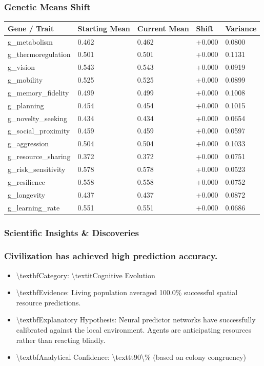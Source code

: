 \documentclass[11pt,a4paper]{article}
\begin{document}
\subsubsection*{ Genetic Means Shift}
\begin{longtable}{lllll}
\toprule
Gene / Trait & Starting Mean & Current Mean & Shift & Variance \\
\midrule
\endhead
g\_metabolism & 0.462 & 0.462 & +0.000 & 0.0800 \\
g\_thermoregulation & 0.501 & 0.501 & +0.000 & 0.1131 \\
g\_vision & 0.543 & 0.543 & +0.000 & 0.0919 \\
g\_mobility & 0.525 & 0.525 & +0.000 & 0.0899 \\
g\_memory\_fidelity & 0.499 & 0.499 & +0.000 & 0.1008 \\
g\_planning & 0.454 & 0.454 & +0.000 & 0.1015 \\
g\_novelty\_seeking & 0.434 & 0.434 & +0.000 & 0.0654 \\
g\_social\_proximity & 0.459 & 0.459 & +0.000 & 0.0597 \\
g\_aggression & 0.504 & 0.504 & +0.000 & 0.1033 \\
g\_resource\_sharing & 0.372 & 0.372 & +0.000 & 0.0751 \\
g\_risk\_sensitivity & 0.578 & 0.578 & +0.000 & 0.0523 \\
g\_resilience & 0.558 & 0.558 & +0.000 & 0.0752 \\
g\_longevity & 0.437 & 0.437 & +0.000 & 0.0872 \\
g\_learning\_rate & 0.551 & 0.551 & +0.000 & 0.0686 \\
\bottomrule
\end{longtable}

\subsubsection*{ Scientific Insights \& Discoveries}
\subsubsection*{ Civilization has achieved high prediction accuracy.}
\begin{itemize}
  \item \textbackslash{}textbf{Category:} \textbackslash{}textit{Cognitive Evolution}
  \item \textbackslash{}textbf{Evidence:} Living population averaged 100.0\% successful spatial resource predictions.
  \item \textbackslash{}textbf{Explanatory Hypothesis:} Neural predictor networks have successfully calibrated against the local environment. Agents are anticipating resources rather than reacting blindly.
  \item \textbackslash{}textbf{Analytical Confidence:} \textbackslash{}texttt{90\textbackslash{}\%} (based on colony congruency)
\end{itemize}
\end{document}
